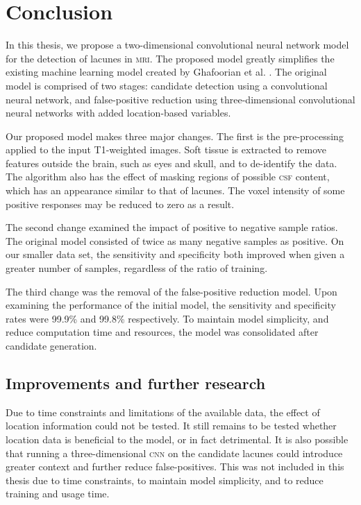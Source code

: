 %
%

\chapter{Conclusion}\label{conclusion}

In this thesis, we propose a two-dimensional convolutional neural network model for the detection of lacunes in \textsc{mri}. The proposed model greatly simplifies the existing machine learning model created by Ghafoorian et al. \cite{GhafoorianM.2017Dml3}. The original model is comprised of two stages: candidate detection using a convolutional neural network, and false-positive reduction using three-dimensional convolutional neural networks with added location-based variables.

Our proposed model makes three major changes. The first is the pre-processing applied to the input T1-weighted images. Soft tissue is extracted to remove features outside the brain, such as eyes and skull, and to de-identify the data. The algorithm also has the effect of masking regions of possible \textsc{csf} content, which has an appearance similar to that of lacunes. The voxel intensity of some positive responses may be reduced to zero as a result.

The second change examined the impact of positive to negative sample ratios. The original model consisted of twice as many negative samples as positive. On our smaller data set, the sensitivity and specificity both improved when given a greater number of samples, regardless of the ratio of training.

The third change was the removal of the false-positive reduction model. Upon examining the performance of the initial model, the sensitivity and specificity rates were 99.9\% and 99.8\% respectively. To maintain model simplicity, and reduce computation time and resources, the model was consolidated after candidate generation.

\section{Improvements and further research}

Due to time constraints and limitations of the available data, the effect of location information could not be tested. It still remains to be tested whether location data is beneficial to the model, or in fact detrimental. It is also possible that running a three-dimensional \textsc{cnn} on the candidate lacunes could introduce greater context and further reduce false-positives. This was not included in this thesis due to time constraints, to maintain model simplicity, and to reduce training and usage time.

